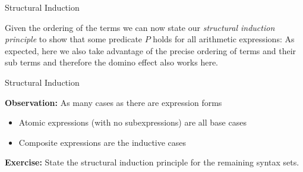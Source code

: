 \documentclass{beamer}
\begin{document}
\begin{frame}{Structural Induction}

\scriptsize
Given the ordering of the terms 
we can now state our {\em structural induction principle} to show that some predicate $P$ holds for
all arithmetic expressions:
As expected, here we also take advantage of the precise ordering of terms and their sub terms and
therefore the domino effect also works here.

\end{frame}




\begin{frame}{Structural Induction}

{\bf Observation:} As many cases as there are expression forms 
\begin{itemize}
\item Atomic expressions (with no subexpressions) are all base 
cases 
\item Composite expressions are the inductive cases 
\end{itemize}

\vspace{.2in}
{\bf Exercise:} State the structural induction principle for the remaining syntax sets.
\end{frame}
\end{document}
